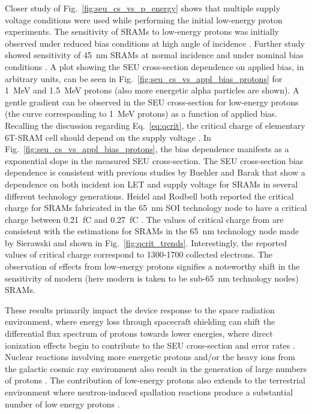 Closer study of Fig.~\ref{fig:seu_cs_vs_p_energy} shows that multiple supply voltage conditions were used while performing the initial low-energy proton experiments.
The sensitivity of SRAMs to low-energy protons was initially observed under reduced bias conditions at high angle of incidence \cite{Heidel:2006tp}.
Further study showed sensitivity of 45~nm SRAMs at normal incidence and under nominal bias conditions \cite{Rodbell:2007vl,Heidel:2009vx}.
A plot showing the SEU cross-section dependence on applied bias, in arbitrary units, can be seen in Fig.~\ref{fig:seu_cs_vs_appl_bias_protons} for 1~MeV and 1.5~MeV protons (also more energetic alpha particles are shown).
A gentle gradient can be observed in the SEU cross-section for low-energy protons (the curve corresponding to 1~MeV protons) as a function of applied bias.
Recalling the discussion regarding Eq.~\ref{eq:qcrit}, the critical charge of elementary 6T-SRAM cell should depend on the supply voltage \cite{buehler1990alpha,roth1993monitoring,barak1999scaling}.
In Fig.~\ref{fig:seu_cs_vs_appl_bias_protons}, the bias dependence manifests as a exponential slope in the measured SEU cross-section.
The SEU cross-section bias dependence is consistent with previous studies by Buehler \cite{buehler1990alpha} and Barak \cite{barak1999scaling,barak2004use} that show a dependence on both incident ion LET and supply voltage for SRAMs in several different technology generations.
Heidel and Rodbell both reported the critical charge for SRAMs fabricated in the 65~nm SOI technology node to have a critical charge between 0.21~fC and 0.27~fC \cite{Heidel:2006tp,Rodbell:2007vl}.
The values of critical charge from \cite{Heidel:2006tp,Rodbell:2007vl} are consistent with the estimations for SRAMs in the 65~nm technology node made by Sierawski and shown in Fig.~\ref{fig:qcrit_trends}.
Interestingly, the reported values of critical charge correspond to 1300-1700 collected electrons.
The observation of effects from low-energy protons signifies a noteworthy shift in the sensitivity of modern (here modern is taken to be sub-65~nm technology nodes) SRAMs.

These results primarily impact the device response to the space radiation environment, where energy loss through spacecraft shielding can shift the differential flux spectrum of protons towards lower energies, where direct ionization effects begin to contribute to the SEU cross-section and error rates \cite{Sierawski:2009ka}.
Nuclear reactions involving more energetic protons and/or the heavy ions from the galactic cosmic ray environment also result in the generation of large numbers of protons \cite{Rodbell:2007vl}.
The contribution of low-energy protons also extends to the terrestrial environment where neutron-induced spallation reactions produce a substantial number of low energy protons \cite{Rodbell:2007vl}.

